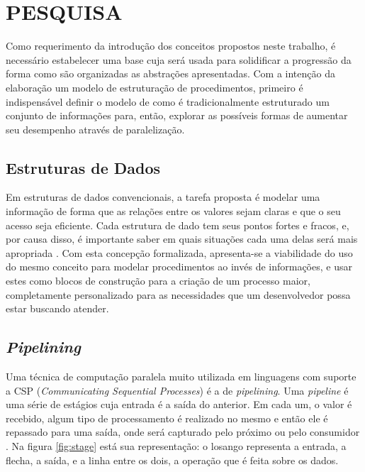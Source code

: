
\chapter{PESQUISA}

  Como requerimento da introdução dos conceitos propostos neste trabalho, é necessário estabelecer uma base cuja será usada para solidificar a progressão da forma como são organizadas as abstrações apresentadas. Com a intenção da elaboração um modelo de estruturação de procedimentos, primeiro é indispensável definir o modelo de como é tradicionalmente estruturado um conjunto de informações para, então, explorar as possíveis formas de aumentar seu desempenho através de paralelização.
  
  \section{Estruturas de Dados}
  
  Em estruturas de dados convencionais, a tarefa proposta é modelar uma informação de forma que as relações entre os valores sejam claras e que o seu acesso seja eficiente. Cada estrutura de dado tem seus pontos fortes e fracos, e, por causa disso, é importante saber em quais situações cada uma delas será mais apropriada \cite{cormen2009}. Com esta concepção formalizada, apresenta-se a viabilidade do uso do mesmo conceito para modelar procedimentos ao invés de informações, e usar estes como blocos de construção para a criação de um processo maior, completamente personalizado para as necessidades que um desenvolvedor possa estar buscando atender.
  
  \section{\textit{Pipelining}}
  
  Uma técnica de computação paralela muito utilizada em linguagens com suporte a CSP (\textit{Communicating Sequential Processes}) é a de \textit{pipelining}. Uma \textit{pipeline} é uma série de estágios cuja entrada é a saída do anterior. Em cada um, o valor é recebido, algum tipo de processamento é realizado no mesmo e então ele é repassado para uma saída, onde será capturado pelo próximo ou pelo consumidor \cite{ajmani2014}. Na figura \ref{fig:stage} está sua representação: o losango representa a entrada, a flecha, a saída, e a linha entre os dois, a operação que é feita sobre os dados.
  
